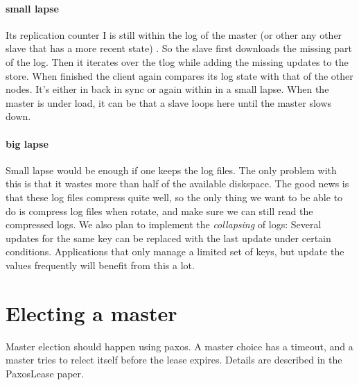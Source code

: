 \paragraph{small lapse}
Its replication counter I is still within the log of the master
(or other any other slave that has a more recent state) . 
So the slave first downloads the missing part of the log.
Then it iterates over the tlog while adding the missing updates to the store.
When finished the client again compares its log state with that of the other nodes. 
It's either in back in sync or again within in a small lapse. 
When the master is under load, it can be that a slave loops here until the master slows down.

\paragraph{big lapse}
Small lapse would be enough if one keeps the log files. 
The only problem with this is that it wastes more than half of the available diskspace. 
The good news is that these log files compress quite well, 
so the only thing we want to be able to do is compress log files when rotate, 
and make sure we can still read the compressed logs. 
We also plan to implement the \emph{collapsing} of logs: 
Several updates for the same key can be replaced with the last update under certain conditions.
Applications that only manage a limited set of keys, but update the values frequently will benefit from this a lot.
\section{Electing a master}
Master election should happen using paxos. 
A master choice has a timeout, and a master tries to relect itself before the lease expires.
Details are described in the PaxosLease paper.

